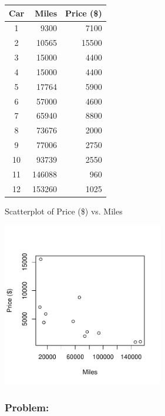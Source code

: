 \documentclass[11pt, chapterprefix=true]{scrbook}\usepackage[]{graphicx}\usepackage[]{color}
\begin{document}
\begin{minipage}[ht]{7cm}
\centering 
\begin{tabular}{@{} c rr @{}} \hline 
Car & Miles & Price (\$) \\ \hline
1 & 9300 & 7100 \\
2 & 10565 & 15500 \\
3 & 15000 & 4400 \\
4 & 15000 & 4400 \\
5 & 17764 & 5900 \\
6 & 57000 & 4600 \\
7 & 65940 & 8800 \\
8 & 73676 & 2000 \\
9 & 77006 & 2750 \\
10 & 93739 & 2550 \\
11 & 146088 & 960 \\
12 & 153260 & 1025 \\ \hline
\end{tabular}
\end{minipage}
\begin{minipage}[ht]{7cm}
\centering
Scatterplot of Price (\$) vs. Miles



{\centering \includegraphics[width=7cm]{figure/LBL14a-1} 

}



\end{minipage}

\subsubsection{Problem:}
\end{document}
